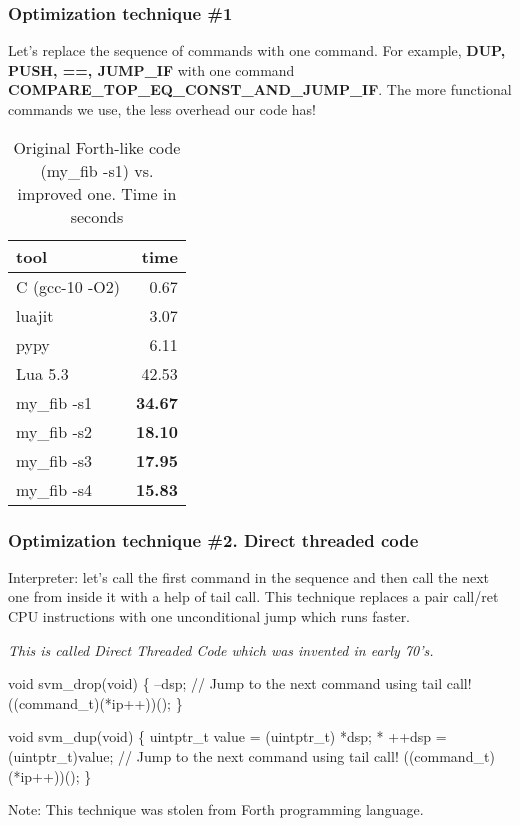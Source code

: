\documentclass[hyperref={colorlinks=true},xcolor=table]{beamer}
\begin{document}
\begin{frame}[fragile]
  \frametitle{Optimization technique \#1}
  Let's replace the sequence of commands with one command. For example,
  \textbf{DUP, PUSH, ==, JUMP\_IF}
  with one command
  \textbf{COMPARE\_TOP\_EQ\_CONST\_AND\_JUMP\_IF}. The more functional
  commands we use, the less overhead our code has!
  \begin{table}
    \begin{tabular}{ | l | r | }
      \hline
      \rowcolor{lightgray} tool & time \\
      \hline
      C (gcc-10 -O2) & 0.67 \\
      luajit & 3.07 \\
      pypy & 6.11 \\
      Lua 5.3 & 42.53 \\
      \hline
      my\_fib -s1   & \textbf{34.67}  \\
      my\_fib -s2   & \textbf{18.10}  \\
      my\_fib -s3   & \textbf{17.95}  \\
      my\_fib -s4   & \textbf{15.83}  \\
      \hline
    \end{tabular}
    \caption{Original Forth-like code (my\_fib -s1)
      vs. improved one. Time in seconds}
  \end{table}
\end{frame}

\smaller
\begin{frame}[fragile]
  \frametitle{Optimization technique \#2. Direct threaded code}
  Interpreter: let's call the first command in the sequence and then
  call the next one from inside it with a help of tail call.  This
  technique replaces a pair call/ret CPU instructions with one
  unconditional jump which runs faster.

  \textit{This is called Direct Threaded Code which was invented in early 70's.}
  \begin{CodeNoLabel}
void svm_drop(void) \{
    --dsp;
    // Jump to the next command using tail call!
    ((command_t)(*ip++))();
\}

void svm_dup(void) \{
    uintptr_t value = (uintptr_t) *dsp;
    * ++dsp = (uintptr_t)value;
    // Jump to the next command using tail call!
    ((command_t)(*ip++))();
\}
  \end{CodeNoLabel}
  Note: This technique was stolen from Forth programming language.
\end{frame}
\normalsize
\end{document}
